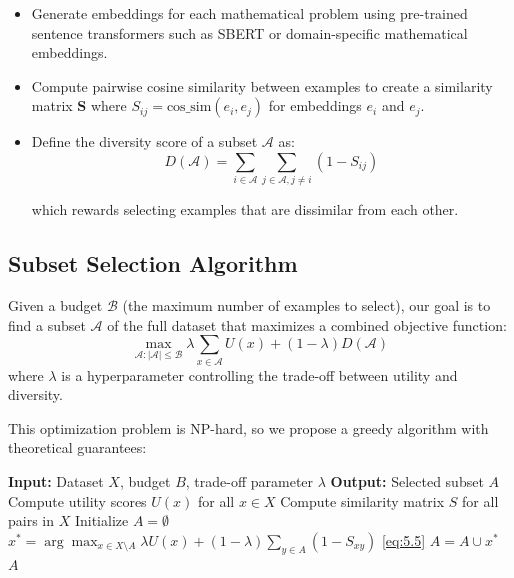\documentclass{article}
\begin{document}
\begin{itemize}
    \item Generate embeddings for each mathematical problem using pre-trained sentence transformers such as SBERT or domain-specific mathematical embeddings.
    \item Compute pairwise cosine similarity between examples to create a similarity matrix $\mathbf{S}$ where 
    $S_{ij} = \text{cos\_sim}(e_i, e_j)$ for embeddings $e_i$ and $e_j$.
    
    \item Define the diversity score of a subset $\mathcal{A}$ as:
    \begin{equation}\label{eq:5.4}
        D(\mathcal{A}) = \sum_{i \in \mathcal{A}} \sum_{j \in \mathcal{A}, j \neq i} (1 - S_{ij})
    \end{equation}
    
    which rewards selecting examples that are dissimilar from each other.

\end{itemize}

\subsection{Subset Selection Algorithm}

Given a budget $\mathcal{B}$ (the maximum number of examples to select), our goal is to find a subset $\mathcal{A}$ of the full dataset that maximizes a combined objective function:
\begin{equation}\label{eq:5.5}
\max_{\mathcal{A} : |\mathcal{A}| \leq \mathcal{B}} \lambda \sum_{x \in \mathcal{A}} U(x) + (1 - \lambda) D(\mathcal{A})
\end{equation}
where $\lambda$ is a hyperparameter controlling the trade-off between utility and diversity.

This optimization problem is NP-hard, so we propose a greedy algorithm with theoretical guarantees:

\begin{algorithm}
\caption{Utility-Diversity Balanced Subset Selection}
\label{alg:2}
\begin{algorithmic}
\STATE \textbf{Input:} Dataset $X$, budget $B$, trade-off parameter $\lambda$
\STATE \textbf{Output:} Selected subset $A$
\STATE Compute utility scores $U(x)$ for all $x \in X$
\STATE Compute similarity matrix $S$ for all pairs in $X$
\STATE Initialize $A = \emptyset$
\STATE $x^* = \arg\max_{x \in X \setminus A} \lambda U(x) + (1-\lambda) \sum_{y \in A} (1 - S_{xy})$ \ref{eq:5.5}
\STATE $A = A \cup {x^*}$
\ENDWHILE
\RETURN $A$
\end{algorithmic}
\end{algorithm}
\end{document}
